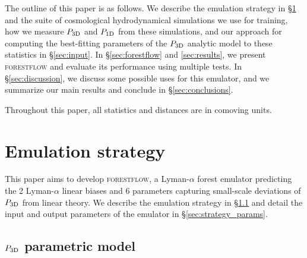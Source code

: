 \documentclass[fleqn,usenatbib]{mnras}
\newcommand{\lya}{Lyman-$\alpha$\xspace}
\newcommand{\lyaf}{Lyman-$\alpha$ forest\xspace}
\newcommand{\poned}{\ensuremath{P_{\rm 1D}}\xspace}
\newcommand{\pthreed}{\ensuremath{P_{\rm 3D}}\xspace}
\newcommand{\forestflow}{\textsc{forestflow}\xspace}
\begin{document}
The outline of this paper is as follows. We describe the emulation strategy in \S\ref{sec:strategy} and the suite of cosmological hydrodynamical simulations we use for training, how we measure \pthreed and \poned from these simulations, and our approach for computing the best-fitting parameters of the \pthreed analytic model to these statistics in \S\ref{sec:input}. In \S\ref{sec:forestflow} and \ref{sec:results}, we present \forestflow and evaluate its performance using multiple tests. In \S\ref{sec:discussion}, we discuss some possible uses for this emulator, and we summarize our main results and conclude in \S\ref{sec:conclusions}.

Throughout this paper, all statistics and distances are in comoving units.


\section{Emulation strategy}
\label{sec:strategy}

This paper aims to develop \forestflow, a \lyaf emulator predicting the 2 \lya linear biases and 6 parameters capturing small-scale deviations of \pthreed from linear theory. We describe the emulation strategy in \S\ref{sec:strategy_model} and detail the input and output parameters of the emulator in \S\ref{sec:strategy_params}.


\subsection{\pthreed parametric model}
\label{sec:strategy_model}
\end{document}
